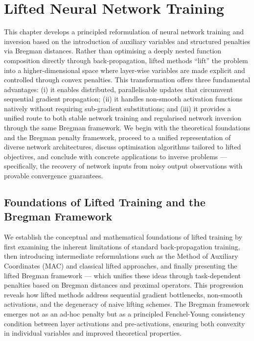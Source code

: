 \chapter{Lifted Neural Network Training}\label{ch:lifted}

This chapter develops a principled reformulation of neural network training and inversion based on the introduction of auxiliary variables and structured penalties via Bregman distances. Rather than optimising a deeply nested function composition directly through back-propagation, lifted methods ``lift'' the problem into a higher-dimensional space where layer-wise variables are made explicit and controlled through convex penalties. This transformation offers three fundamental advantages: (i) it enables distributed, parallelisable updates that circumvent sequential gradient propagation; (ii) it handles non-smooth activation functions natively without requiring sub-gradient substitutions; and (iii) it provides a unified route to both stable network training and regularised network inversion through the same Bregman framework. We begin with the theoretical foundations and the Bregman penalty framework, proceed to a unified representation of diverse network architectures, discuss optimisation algorithms tailored to lifted objectives, and conclude with concrete applications to inverse problems — specifically, the recovery of network inputs from noisy output observations with provable convergence guarantees.

\section{Foundations of Lifted Training and the Bregman Framework}

We establish the conceptual and mathematical foundations of lifted training by first examining the inherent limitations of standard back-propagation training, then introducing intermediate reformulations such as the Method of Auxiliary Coordinates (MAC) and classical lifted approaches, and finally presenting the lifted Bregman framework — which unifies these ideas through task-dependent penalties based on Bregman distances and proximal operators. This progression reveals how lifted methods address sequential gradient bottlenecks, non-smooth activations, and the degeneracy of naive lifting schemes. The Bregman framework emerges not as an ad-hoc penalty but as a principled Fenchel-Young consistency condition between layer activations and pre-activations, ensuring both convexity in individual variables and improved theoretical properties.

